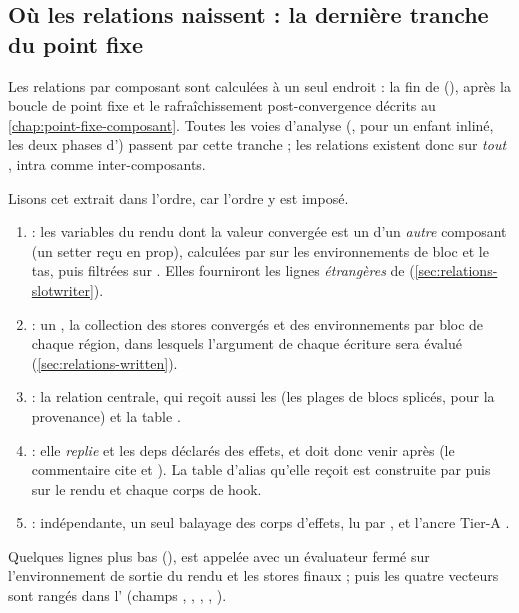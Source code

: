 \subsection{Où les relations naissent : la dernière tranche du point fixe}

Les relations par composant sont calculées à un seul endroit : la fin de  (), après la boucle de point fixe et le rafraîchissement post-convergence décrits au \cref{chap:point-fixe-composant}. Toutes les voies d'analyse (,  pour un enfant inliné, les deux phases d') passent par cette tranche ; les relations existent donc sur \emph{tout} , intra comme inter-composants.


Lisons cet extrait dans l'ordre, car l'ordre y est imposé.
\begin{enumerate}
  \item {} : les variables du rendu dont la valeur convergée est un  d'un \emph{autre} composant (un setter reçu en prop), calculées par  sur les environnements de bloc et le tas, puis filtrées sur . Elles fourniront les lignes \emph{étrangères} de  (\cref{sec:relations-slotwriter}).
  \item {} : un , la collection des stores convergés et des environnements par bloc de chaque région, dans lesquels l'argument de chaque écriture sera évalué (\cref{sec:relations-written}).
  \item {} : la relation centrale, qui reçoit aussi les  (les plages de blocs splicés, pour la provenance) et la table .
  \item {} : elle \emph{replie}  et les deps déclarés des effets, et doit donc venir après (le commentaire cite  et ). La table d'alias  qu'elle reçoit est construite par  puis  sur le rendu et chaque corps de hook.
  \item {} : indépendante, un seul balayage des corps d'effets, lu par ,  et l'ancre Tier-A .
\end{enumerate}
Quelques lignes plus bas (),  est appelée avec un évaluateur  fermé sur l'environnement de sortie du rendu et les stores finaux ; puis les quatre vecteurs sont rangés dans l' (champs , , , , ).

